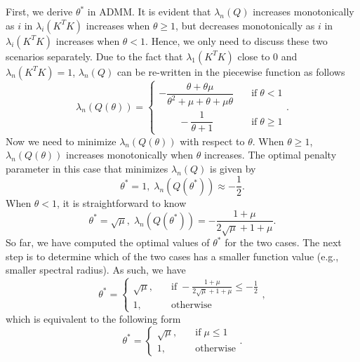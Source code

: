 \documentclass[letterpaper]{article} %
\begin{document}
First, we derive $\theta^*$ in ADMM. It is evident that $\lambda_n(Q)$ increases monotonically as $i$ in $\lambda_i(K^T K)$ increases when $\theta\geq 1$, but decreases monotonically as $i$ in $\lambda_i(K^T K)$ increases when $\theta< 1$. Hence, we only need to discuss these two scenarios separately. Due to the fact that $\lambda_{1} (K^T K)$ close to 0 and $\lambda_n (K^T K)=1$, $\lambda_n (Q)$ can be re-written in the piecewise function as follows
  \begin{equation*}
  	\lambda_n(Q(\theta))=
 	\begin{cases}
  		-\dfrac{\theta+\theta\mu}{\theta^2+\mu+\theta +\mu\theta}\quad & \text{if}\;\theta < 1 \\
  		\qquad-\dfrac{1 }{\theta+1}\quad & \text{if}\;\theta\geq 1
  	\end{cases}.
  \end{equation*}
Now we need to minimize $\lambda_n(Q(\theta))$ with respect to $\theta$. When $\theta\geq 1$, $\lambda_n(Q(\theta))$ increases monotonically when $\theta$ increases. The optimal penalty parameter in this case that minimizes $\lambda_n(Q)$ is given by
\begin{equation*}
\theta^*=1,\; \lambda_n (Q(\theta^*))\approx -\frac{1}{2}.
\end{equation*}
When $\theta<1$, it is straightforward to know
\begin{equation*}\label{Q2}
	\theta^*=\sqrt{\mu},\; \lambda_n \left(Q(\theta^*)\right)=-\frac{1+\mu }{2 \sqrt{\mu}+1 +\mu }.
\end{equation*}
So far, we have computed the optimal values of $\theta^*$ for the two cases. The next step is to determine which of the two cases has a smaller function value (e.g., smaller spectral radius). As such, we have
\begin{equation*}
	\theta^*=
	\begin{cases}
		\sqrt{\mu},\quad & \text{if}\;-\frac{1+\mu }{2 \sqrt{\mu}+1 +\mu } \leq -\frac{1}{2} \\
		1,\quad & \text{otherwise}
	\end{cases},
\end{equation*}
which is equivalent to the following form
\begin{equation*}
	\theta^*=
	\begin{cases}
		\sqrt{\mu},\quad & \text{if}\;\mu \leq 1 \\
		1,\quad & \text{otherwise}
	\end{cases}.
\end{equation*}
\end{document}
